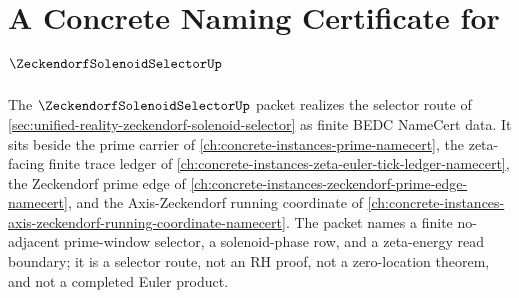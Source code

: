 \chapter{A Concrete Naming Certificate for $\ZeckendorfSolenoidSelectorUp$}
\label{ch:concrete-instances-zeckendorf-solenoid-selector-namecert}

The $\ZeckendorfSolenoidSelectorUp$ packet realizes the selector route of
\autoref{sec:unified-reality-zeckendorf-solenoid-selector} as finite BEDC
NameCert data. It sits beside the prime carrier of
\autoref{ch:concrete-instances-prime-namecert}, the zeta-facing finite trace
ledger of \autoref{ch:concrete-instances-zeta-euler-tick-ledger-namecert},
the Zeckendorf prime edge of
\autoref{ch:concrete-instances-zeckendorf-prime-edge-namecert}, and the
Axis-Zeckendorf running coordinate of
\autoref{ch:concrete-instances-axis-zeckendorf-running-coordinate-namecert}.
The packet names a finite no-adjacent prime-window selector, a solenoid-phase
row, and a zeta-energy read boundary; it is a selector route, not an RH proof,
not a zero-location theorem, and not a completed Euler product.

